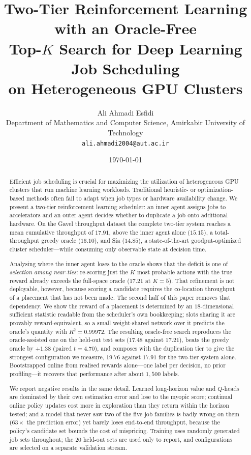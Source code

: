 \documentclass{article}
\title{Two-Tier Reinforcement Learning with an Oracle-Free\\
Top-$K$ Search for Deep Learning Job Scheduling\\
on Heterogeneous GPU Clusters}
\author{Ali Ahmadi Esfidi\\ \small Department of Mathematics and Computer Science, Amirkabir University of Technology\\ \small \texttt{ali.ahmadi2004@aut.ac.ir}}
\date{\today}
\begin{document}
\maketitle

\begin{abstract}
Efficient job scheduling is crucial for maximizing the utilization of
heterogeneous GPU clusters that run machine learning workloads. Traditional
heuristic- or optimization-based methods often fail to adapt when job types or
hardware availability change. We present a two-tier reinforcement learning
scheduler: an inner agent assigns jobs to accelerators and an outer agent decides
whether to duplicate a job onto additional hardware. On the Gavel throughput
dataset the complete two-tier system reaches a mean cumulative throughput of
$17.91$, above the inner agent alone ($15.15$), a total-throughput greedy oracle
($16.10$), and Sia ($14.85$), a state-of-the-art goodput-optimized cluster
scheduler---while consuming only observable state at decision time.

Analysing where the inner agent loses to the oracle shows that the deficit is one
of \emph{selection among near-ties}: re-scoring just the $K$ most probable actions
with the true reward already exceeds the full-space oracle ($17.21$ at $K{=}5$).
That refinement is not deployable, however, because scoring a candidate requires
the co-location throughput of a placement that has not been made. The second half
of this paper removes that dependency. We show the reward of a placement is
determined by an $18$-dimensional sufficient statistic readable from the
scheduler's own bookkeeping; slots sharing it are provably reward-equivalent, so a
small weight-shared network over it predicts the oracle's quantity with
$R^2 = 0.99972$. The resulting oracle-free search reproduces the oracle-assisted
one on the held-out test sets ($17.48$ against $17.21$), beats the greedy oracle
by $+1.38$ (paired $t = 4.70$), and composes with the duplication tier to give the
strongest configuration we measure, $19.76$ against $17.91$ for the two-tier
system alone. Bootstrapped online from realised rewards alone---one label per
decision, no prior profiling---it recovers that performance after about $1{,}500$
labels.

We report negative results in the same detail. Learned long-horizon value and
$Q$-heads are dominated by their own estimation error and lose to the myopic
score; continual online policy updates cost more in exploration than they return
within the horizon tested; and a model that never saw two of the five job families
is badly wrong on them ($63\times$ the prediction error) yet barely loses end-to-end
throughput, because the policy's candidate set bounds the cost of mispricing.
Training uses randomly generated job sets throughout; the $20$ held-out sets are
used only to report, and configurations are selected on a separate validation
stream.
\end{abstract}
\end{document}
